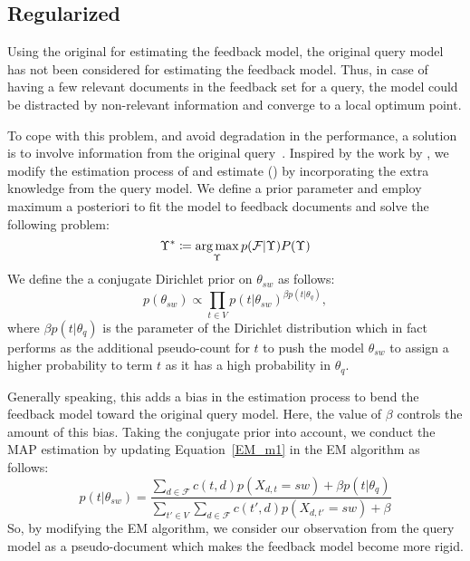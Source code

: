
\subsection{Regularized \acswlm}
Using the original \swlms for estimating the feedback model, the original query model has not been considered for estimating the feedback model. Thus, in case of having a few relevant documents in the feedback set for a query, the model could be distracted by non-relevant information and converge to a local optimum point.

To cope with this problem, and avoid degradation in the performance, a solution is to involve information from the original query~\citep{Harman:1992}. Inspired by the work by \citet{Tao:2006}, we modify the estimation process of \acswlm and estimate \RSWLMs (\acrswlm) by incorporating the extra knowledge from the query model. We define a prior parameter and employ maximum a posteriori to fit the model to feedback documents and solve the following problem:
\begin{equation}
\Upsilon^* \coloneqq \operatorname*{arg\,max}_\Upsilon p(\mathcal{F}|\Upsilon)P(\Upsilon)
\end{equation}
We define the a conjugate Dirichlet prior on $\theta_{sw}$ as follows:
\begin{equation}
p(\theta_{sw}) \varpropto \prod_{t \in V} p(t|\theta_{sw})^{\beta p(t|\theta_q)},
\end{equation}
where $\beta p(t|\theta_q)$ is the parameter of the Dirichlet distribution which in fact performs as the additional pseudo-count for  $t$ to push the model $\theta_{sw}$ to assign a higher probability to term $t$ as it has a high probability in $\theta_q$. 

Generally speaking, this adds a bias in the estimation process to bend the feedback model toward the original query model. 
Here, the value of $\beta$ controls the amount of this bias. 
Taking the conjugate prior into account, we conduct the MAP estimation by updating Equation~\ref{EM_m1} in the EM algorithm as follows:
\begin{equation}
p(t|\theta_{sw}) = 
\frac{\sum_{d \in \mathcal{F}}c(t,d) p(X_{d,t} = sw) + \beta p(t|\theta_q) }{\sum_{t' \in V}\sum_{d \in \mathcal{F}}c(t',d) p(X_{d,t'} = sw) + \beta}
\label{EM_m1_new}
\end{equation}
So, by modifying the EM algorithm, we consider our observation from the query model as a pseudo-document which makes the feedback model become more rigid. 

